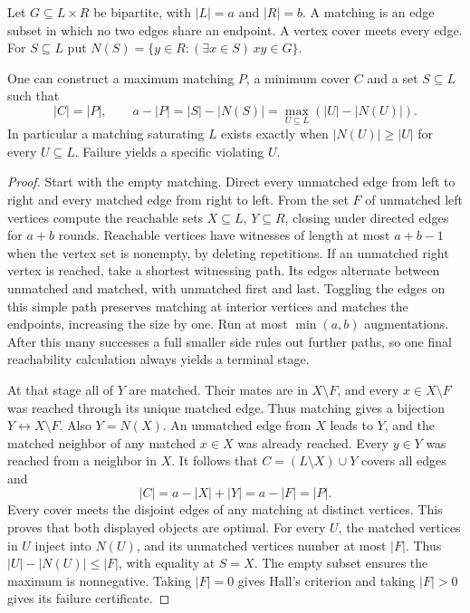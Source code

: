 Let $G\subseteq L\times R$ be bipartite, with $|L|=a$ and $|R|=b$. A matching is an edge subset in which no two edges share an endpoint. A vertex cover meets every edge. For $S\subseteq L$ put $N(S)=\{y\in R:(\exists x\in S)\,xy\in G\}$.

\begin{theorem}\label{result28}\label{thm:matching-cover}
One can construct a maximum matching $P$, a minimum cover $C$ and a set $S\subseteq L$ such that
\[
 |C|=|P|,\qquad a-|P|=|S|-|N(S)|
     =\max_{U\subseteq L} (|U|-|N(U)|).
\]
In particular a matching saturating $L$ exists exactly when $|N(U)|\ge |U|$ for every $U\subseteq L$. Failure yields a specific violating $U$.
\end{theorem}
\begin{proof}
Start with the empty matching. Direct every unmatched edge from left to right and every matched edge from right to left. From the set $F$ of unmatched left vertices compute the reachable sets $X\subseteq L$, $Y\subseteq R$, closing under directed edges for $a+b$ rounds. Reachable vertices have witnesses of length at most $a+b-1$ when the vertex set is nonempty, by deleting repetitions. If an unmatched right vertex is reached, take a shortest witnessing path. Its edges alternate between unmatched and matched, with unmatched first and last. Toggling the edges on this simple path preserves matching at interior vertices and matches the endpoints, increasing the size by one. Run at most $\min(a,b)$ augmentations. After this many successes a full smaller side rules out further paths, so one final reachability calculation always yields a terminal stage.

At that stage all of $Y$ are matched. Their mates are in $X\setminus F$, and every $x\in X\setminus F$ was reached through its unique matched edge. Thus matching gives a bijection $Y\longleftrightarrow X\setminus F$. Also $Y=N(X)$. An unmatched edge from $X$ leads to $Y$, and the matched neighbor of any matched $x\in X$ was already reached. Every $y\in Y$ was reached from a neighbor in $X$. It follows that $C=(L\setminus X)\cup Y$ covers all edges and
\[
 |C|=a-|X|+|Y|=a-|F|=|P|.
\]
Every cover meets the disjoint edges of any matching at distinct vertices. This proves that both displayed objects are optimal. For every $U$, the matched vertices in $U$ inject into $N(U)$, and its unmatched vertices number at most $|F|$. Thus $|U|-|N(U)|\le |F|$, with equality at $S=X$. The empty subset ensures the maximum is nonnegative. Taking $|F|=0$ gives Hall's criterion and taking $|F|>0$ gives its failure certificate.
\end{proof}


